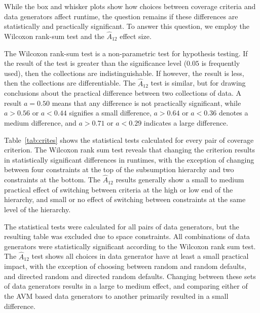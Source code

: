 
While the box and whisker plots show how choices between coverage criteria and data generators affect runtime, the
question remains if these differences are statistically and practically significant. To answer this question, we employ
the Wilcoxon rank-sum test and the $\hat{A}_{12}$ effect size.

The Wilcoxon rank-sum test is a non-parametric test for hypothesis testing.  If the result of the test is greater than
the significance level ($0.05$ is frequently used), then the collections are indistinguishable.  If however, the result
is less, then the collections are differentiable.  The $\hat{A}_{12}$ test is similar, but for drawing conclusions about
the practical difference between two collections of data.  A result $a=0.50$ means that any difference is not
practically significant, while $a>0.56$ or $a<0.44$ signifies a small difference, $a>0.64$ or $a<0.36$ denotes a medium
difference, and $a>0.71$ or $a<0.29$ indicates a large difference.

Table~\ref{tab:crites} shows the statistical tests calculated for every pair of coverage criterion. The Wilcoxon rank
sum test reveals that changing the criterion results in statistically significant differences in runtimes, with the
exception of changing between four constraints at the top of the subsumption hierarchy and two constraints at the
bottom.  The $\hat{A}_{12}$ results generally show a small to medium practical effect of switching between criteria at
the high or low end of the hierarchy, and small or no effect of switching between constraints at the same level of the
hierarchy.

The statistical tests were calculated for all pairs of data generators, but the resulting table was excluded due to
space constraints. All combinations of data generators were statistically significant according to the Wilcoxon rank sum
test. The $\hat{A}_{12}$ test shows all choices in data generator have at least a small practical impact, with the
exception of choosing between random and random defaults, and directed random and directed random defaults.  Changing
between these sets of data generators results in a large to medium effect, and comparing either of the AVM based data
generators to another primarily resulted in a small difference.
